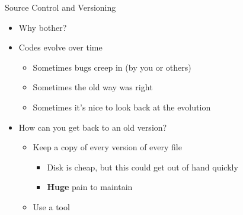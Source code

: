 \documentclass[onlymath, nologo]{beamer}
\begin{document}
  \begin{frame}{Source Control and Versioning}
    \begin{itemize}
      \item Why bother? \\[1.0em]
      \item Codes evolve over time \\[0.5em]
        \begin{itemize}
          \item Sometimes bugs creep in (by you or others) \\[0.5em]
          \item Sometimes the old way was right  \\[0.5em]
          \item Sometimes it's nice to look back at the evolution \\[1.0em]
        \end{itemize}
      \item How can you get back to an old version? \\[0.5em]
        \begin{itemize}
          \item Keep a copy of every version of every file \\[0.5em] 
            \begin{itemize}
              \item Disk is cheap, but this could get out of hand quickly  \\[0.25em]
              \item \textbf{Huge} pain to maintain \\[0.5em]
            \end{itemize}
          \item Use a tool
        \end{itemize}
    \end{itemize}
  \end{frame}
\end{document}
